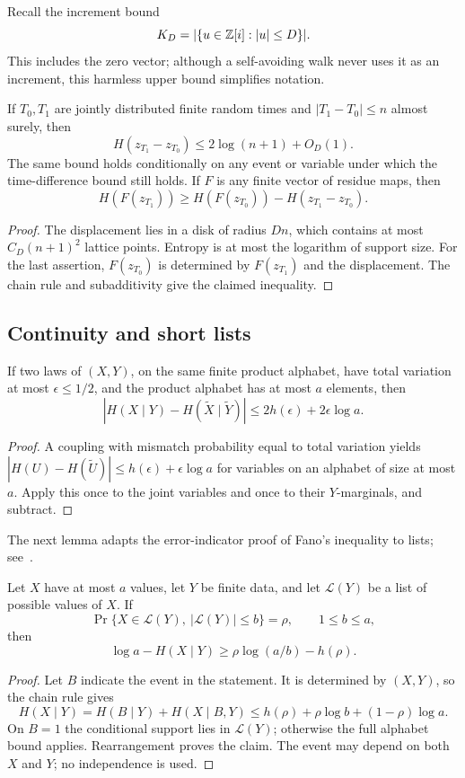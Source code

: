 Recall the increment bound
\[
K_D=|\{u\in\mathbb Z[i]:|u|\le D\}|.
\]
This includes the zero vector; although a self-avoiding walk never
uses it as an increment, this harmless upper bound simplifies notation.

\begin{lemma}\label{lem:displacement}
If \(T_0,T_1\) are jointly distributed finite random times and
\(|T_1-T_0|\le n\) almost surely, then
\[
H(z_{T_1}-z_{T_0})\le2\log(n+1)+O_D(1).
\]
The same bound holds conditionally on any event or variable under
which the time-difference bound still holds.
If \(F\) is any finite vector of residue maps, then
\[
H(F(z_{T_1}))\ge H(F(z_{T_0}))-H(z_{T_1}-z_{T_0}).
\]
\end{lemma}
\begin{proof}
The displacement lies in a disk of radius \(Dn\), which contains at
most \(C_D(n+1)^2\) lattice points. Entropy is at most the logarithm
of support size. For the last assertion, \(F(z_{T_0})\) is determined
by \(F(z_{T_1})\) and the displacement. The chain rule and
subadditivity give the claimed inequality.
\end{proof}

\subsection{Continuity and short lists}

\begin{lemma}[Continuity]\label{lem:continuity}
If two laws of \((X,Y)\), on the same finite product alphabet, have
total variation at most \(\epsilon\le1/2\), and the product alphabet
has at most \(a\) elements, then
\[
|H(X\mid Y)-H(\widetilde X\mid\widetilde Y)|
\le 2h(\epsilon)+2\epsilon\log a.
\]
\end{lemma}
\begin{proof}
A coupling with mismatch probability equal to total variation yields
\(|H(U)-H(\widetilde U)|\le h(\epsilon)+\epsilon\log a\)
for variables on an alphabet of size at most \(a\).
Apply this once to the joint variables and once to their
\(Y\)-marginals, and subtract.
\end{proof}

The next lemma adapts the error-indicator proof of Fano's inequality
to lists; see~\cite[Theorem 2.10.1]{CoverThomas}.

\begin{lemma}\label{lem:list}
Let \(X\) have at most \(a\) values, let \(Y\) be finite data, and let
\(\mathcal L(Y)\) be a list of possible values of \(X\).
If
\[
\Pr\{X\in\mathcal L(Y),\ |\mathcal L(Y)|\le b\}=\rho,
\qquad 1\le b\le a,
\]
then
\[
\log a-H(X\mid Y)\ge \rho\log(a/b)-h(\rho).
\]
\end{lemma}
\begin{proof}
Let $B$ indicate the event in the statement. It is determined by $(X,Y)$,
so the chain rule gives
\[
H(X\mid Y)=H(B\mid Y)+H(X\mid B,Y)
\le h(\rho)+\rho\log b+(1-\rho)\log a.
\]
On $B=1$ the conditional support lies in $\mathcal L(Y)$; otherwise the
full alphabet bound applies. Rearrangement proves the claim.
The event may depend on both $X$ and $Y$; no independence is used.
\end{proof}
